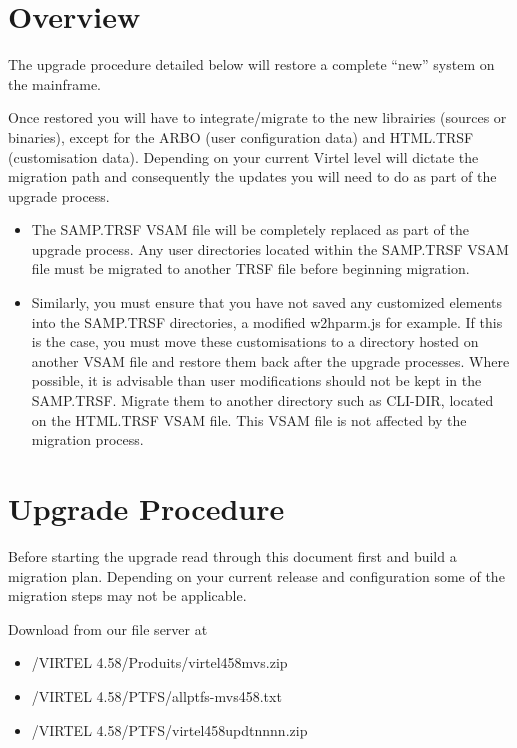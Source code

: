 \documentclass[letterpaper,10pt,english]{sphinxmanual}
\begin{document}
\section{Overview}
\label{\detokenize{Migration_Guide:overview}}
The upgrade procedure detailed below will restore a complete “new” system on the mainframe.

Once restored you will have to integrate/migrate to the new librairies (sources or binaries), except for the ARBO (user configuration data) and HTML.TRSF (customisation data). Depending on your current Virtel level will dictate the migration path and consequently the updates you will need to do as part of the upgrade process.
\begin{itemize}
\item {} 
The SAMP.TRSF VSAM file will be completely replaced as part of the upgrade process. Any user directories located within the SAMP.TRSF VSAM file must be migrated to another TRSF file before beginning migration.

\item {} 
Similarly, you must ensure that you have not saved any customized elements into the SAMP.TRSF directories, a modified w2hparm.js for example. If this is the case, you must move these customisations to a directory hosted on another VSAM file and restore them back after the upgrade processes. Where possible, it is advisable than user modifications should not be kept in the SAMP.TRSF. Migrate them to another directory such as CLI-DIR, located on the HTML.TRSF VSAM file. This VSAM file is not affected by the migration process.

\end{itemize}

\newpage


\section{Upgrade Procedure}
\label{\detokenize{Migration_Guide:upgrade-procedure}}\label{\detokenize{Migration_Guide:index-1}}
Before starting the upgrade read through this document first and build a migration plan. Depending on your current release and configuration some of the migration steps may not be applicable.

Download from our file server at 
\begin{itemize}
\item {} 
/VIRTEL 4.58/Produits/virtel458mvs.zip

\item {} 
/VIRTEL 4.58/PTFS/allptfs-mvs458.txt

\item {} 
/VIRTEL 4.58/PTFS/virtel458updtnnnn.zip

\end{itemize}
\end{document}
